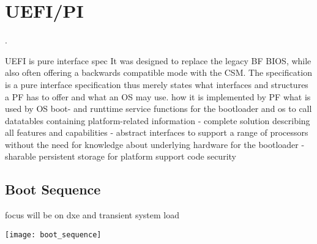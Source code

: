 

\section{\acs{UEFI}/\acs{PI}}
.

UEFI is pure interface spec
\cite{beyond-bios}
It was designed to replace the legacy \acl{BF} \ac{BIOS}, while also often offering a backwards compatible mode with the \acf{CSM}.
The specification is a pure interface specification thus merely states what interfaces and structures a \ac{PF} has to offer and what an \ac{OS} may use.
how it is implemented by PF
what is used by OS
boot- and runttime service functions for the bootloader and os to call
datatables containing platform-related information
- complete solution describing all features and capabilities
- abstract interfaces to support a range of processors without the need for knowledge about underlying hardware for the bootloader
- sharable persistent storage for platform support code
security

\subsection{Boot Sequence}

focus will be on dxe and transient system load

\texttt{[image: boot\_sequence]}


